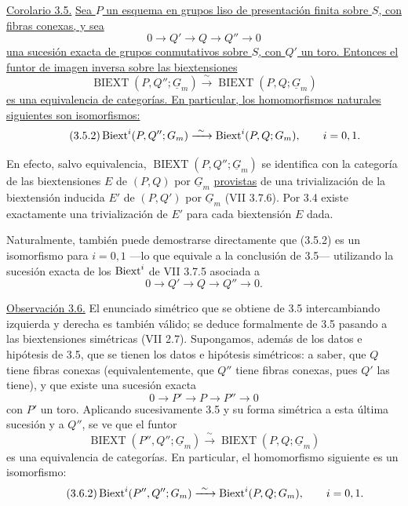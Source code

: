 \par\medskip
\noindent\underline{Corolario 3.5.} \underline{Sea $P$ un esquema en
grupos liso de presentación finita sobre $S$, con fibras conexas, y
sea}
\[
 0\longrightarrow Q'\longrightarrow Q\longrightarrow Q''
 \longrightarrow0
\]
\underline{una sucesión exacta de grupos conmutativos sobre $S$, con
$Q'$ un toro. Entonces el funtor de imagen inversa sobre las
biextensiones}
\begin{equation}\tag{3.5.1}
 \operatorname{BIEXT}(P,Q'';\underline G_m)
 \xrightarrow{\ \sim\ }
 \operatorname{BIEXT}(P,Q;\underline G_m)
\end{equation}
\underline{es una equivalencia de categorías. En particular, los
homomorfismos naturales siguientes son isomorfismos:}
\begin{equation}\tag{3.5.2}
 \Biext^i(P,Q'';\underline G_m)
 \xrightarrow{\ \sim\ }
 \Biext^i(P,Q;\underline G_m),
 \qquad i=0,1.
\end{equation}

En efecto, salvo equivalencia,
$\operatorname{BIEXT}(P,Q'';\underline G_m)$ se identifica con la
categoría de las biextensiones $E$ de $(P,Q)$ por $\underline G_m$
\underline{provistas} de una trivialización de la biextensión inducida
$E'$ de $(P,Q')$ por $\underline G_m$ (VII 3.7.6). Por 3.4 existe
exactamente una trivialización de $E'$ para cada biextensión $E$ dada.


Naturalmente, también puede demostrarse directamente que (3.5.2) es
un isomorfismo para $i=0,1$ —lo que equivale a la conclusión de 3.5—
utilizando la sucesión exacta de los $\Biext^i$ de VII 3.7.5 asociada
a
\[
 0\longrightarrow Q'\longrightarrow Q\longrightarrow Q''
 \longrightarrow0.
\]

\medskip
\noindent\underline{Observación 3.6.} El enunciado simétrico que se
obtiene de 3.5 intercambiando izquierda y derecha es también válido;
se deduce formalmente de 3.5 pasando a las biextensiones simétricas
(VII 2.7). Supongamos, además de los datos e hipótesis de 3.5, que se
tienen los datos e hipótesis simétricos: a saber, que $Q$ tiene fibras
conexas (equivalentemente, que $Q''$ tiene fibras conexas, pues $Q'$
las tiene), y que existe una sucesión exacta
\[
 0\longrightarrow P'\longrightarrow P\longrightarrow P''
 \longrightarrow0
\]
con $P'$ un toro. Aplicando sucesivamente 3.5 y su forma simétrica a
esta última sucesión y a $Q''$, se ve que el funtor
\begin{equation}\tag{3.6.1}
 \operatorname{BIEXT}(P'',Q'';\underline G_m)
 \xrightarrow{\ \sim\ }
 \operatorname{BIEXT}(P,Q;\underline G_m)
\end{equation}
es una equivalencia de categorías. En particular, el homomorfismo
siguiente es un isomorfismo:
\begin{equation}\tag{3.6.2}
 \Biext^i(P'',Q'';\underline G_m)
 \xrightarrow{\ \sim\ }
 \Biext^{\sisi{1}{i}}(P,Q;\underline G_m),
 \qquad i=0,1.
\end{equation}

